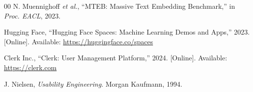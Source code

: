 \documentclass[conference]{IEEEtran}
\begin{document}
\begin{thebibliography}{00}
N. Muennighoff \textit{et al.},
``MTEB: Massive Text Embedding Benchmark,''
in \textit{Proc. EACL}, 2023.

Hugging Face,
``Hugging Face Spaces: Machine Learning Demos and Apps,''
2023. [Online]. Available: \url{https://huggingface.co/spaces}

Clerk Inc.,
``Clerk: User Management Platform,''
2024. [Online]. Available: \url{https://clerk.com}

J. Nielsen,
\textit{Usability Engineering}.
Morgan Kaufmann, 1994.

\end{thebibliography}
\end{document}
